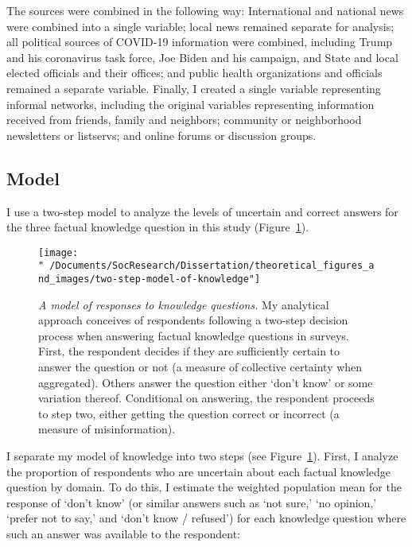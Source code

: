 \documentclass[11pt]{article}
\begin{document}
The sources were combined in the following way: International and national news
were combined into a single variable; local news remained separate for analysis;
all political sources of COVID-19 information were combined, including Trump and
his coronavirus task force, Joe Biden and his campaign, and State and local
elected officials and their offices; and public health organizations and
officials remained a separate variable. Finally, I created a single variable
representing informal networks, including the original variables representing
information received from friends, family and neighbors; community or
neighborhood newsletters or listservs; and online forums or discussion groups.


\subsection{Model}\label{sec:model}


I use a two-step model to analyze the
levels of uncertain and correct answers for the three factual knowledge
question in this study (Figure~\ref{fig:TwoStepModelOfKnowledge}).

\begin{figure}[ht]
  \begin{center}
    \texttt{[image: "~/Documents/SocResearch/Dissertation/theoretical\_figures\_and\_images/two-step-model-of-knowledge"]}
  \end{center}
  \caption[A model of responses to knowledge questions]
  {\emph{A model of responses to knowledge questions.}
   My analytical approach conceives of respondents following a two-step decision
   process when answering factual knowledge questions in surveys. First, the
   respondent decides if they are sufficiently certain to answer the question or
   not (a measure of collective certainty when aggregated). Others answer the
   question either `don't know' or some variation thereof. Conditional on
   answering, the respondent proceeds to step two, either getting the question
   correct or incorrect (a measure of misinformation).}
  \label{fig:TwoStepModelOfKnowledge}
\end{figure}

I separate my model of knowledge into two steps (see
Figure~\ref{fig:TwoStepModelOfKnowledge}). First, I analyze the proportion of
respondents who are uncertain about each factual knowledge
question by domain. To do this, I estimate the weighted population mean for the
response of `don't know' (or similar answers such as `not sure,' `no opinion,'
`prefer not to say,' and `don't know / refused') for each knowledge question
where such an answer was available to the respondent:
\end{document}
